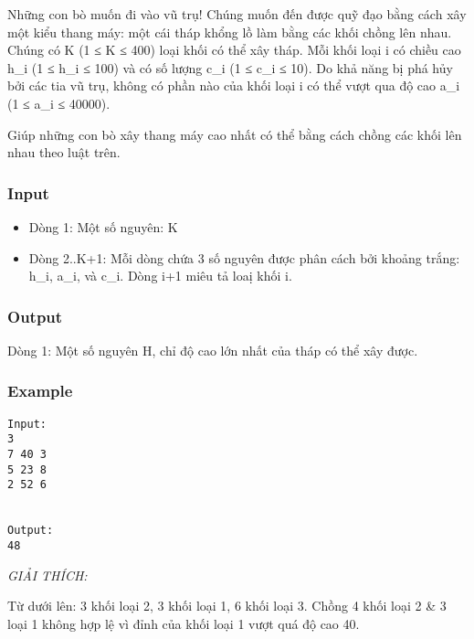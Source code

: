 

Những con bò muốn đi vào vũ trụ! Chúng muốn đến được quỹ đạo bằng cách xây một kiểu thang máy: một cái tháp khổng lồ làm bằng các khối chồng lên nhau. Chúng có K (1 ≤ K ≤ 400) loại khối có thể xây tháp. Mỗi khối loại i có chiều cao h\_i (1 ≤ h\_i ≤ 100) và có số lượng c\_i (1 ≤ c\_i ≤ 10). Do khả năng bị phá hủy bởi các tia vũ trụ, không có phần nào của khối loại i có thể vượt qua độ cao a\_i (1 ≤ a\_i ≤ 40000).

Giúp những con bò xây thang máy cao nhất có thể bằng cách chồng các khối lên nhau theo luật trên.

\subsubsection{Input}
\begin{itemize}
	\item Dòng 1: Một số nguyên: K
	\item Dòng 2..K+1: Mỗi dòng chứa 3 số nguyên được phân cách bởi khoảng trắng: h\_i, a\_i, và c\_i. Dòng i+1 miêu tả loaị khối i.
\end{itemize}

\subsubsection{Output}

Dòng 1: Một số nguyên H, chỉ độ cao lớn nhất của tháp có thể xây được.

\subsubsection{Example}
\begin{verbatim}
Input:
3
7 40 3
5 23 8
2 52 6


Output:
48
\end{verbatim}

\emph{GIẢI THÍCH: }

Từ dưới lên: 3 khối loại 2, 3 khối loại 1, 6 khối loại 3. Chồng 4 khối loại 2 \& 3 loại 1 không hợp lệ vì đỉnh của khối loại 1 vượt quá độ cao 40.
